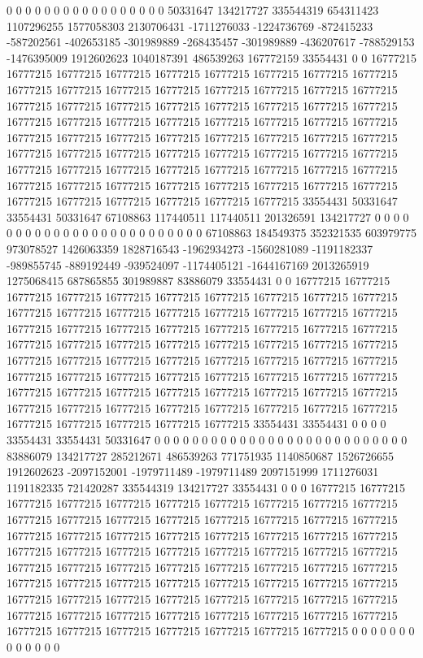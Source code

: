 0 0 0 0 0 0 0 0 0 0 0 0 0 0 0 0 0 50331647 134217727 335544319 654311423 1107296255 1577058303 2130706431 -1711276033 -1224736769 -872415233 -587202561 -402653185 -301989889 -268435457 -301989889 -436207617 -788529153 -1476395009 1912602623 1040187391 486539263 167772159 33554431 0 0 16777215 16777215 16777215 16777215 16777215 16777215 16777215 16777215 16777215 16777215 16777215 16777215 16777215 16777215 16777215 16777215 16777215 16777215 16777215 16777215 16777215 16777215 16777215 16777215 16777215 16777215 16777215 16777215 16777215 16777215 16777215 16777215 16777215 16777215 16777215 16777215 16777215 16777215 16777215 16777215 16777215 16777215 16777215 16777215 16777215 16777215 16777215 16777215 16777215 16777215 16777215 16777215 16777215 16777215 16777215 16777215 16777215 16777215 16777215 16777215 16777215 16777215 16777215 16777215 16777215 16777215 16777215 16777215 16777215 16777215 16777215 33554431 50331647 33554431 50331647 67108863 117440511 117440511 201326591 134217727 0 0 0 0 0 0
0 0 0 0 0 0 0 0 0 0 0 0 0 0 0 0 0 0 0 67108863 184549375 352321535 603979775 973078527 1426063359 1828716543 -1962934273 -1560281089 -1191182337 -989855745 -889192449 -939524097 -1174405121 -1644167169 2013265919 1275068415 687865855 301989887 83886079 33554431 0 0 16777215 16777215 16777215 16777215 16777215 16777215 16777215 16777215 16777215 16777215 16777215 16777215 16777215 16777215 16777215 16777215 16777215 16777215 16777215 16777215 16777215 16777215 16777215 16777215 16777215 16777215 16777215 16777215 16777215 16777215 16777215 16777215 16777215 16777215 16777215 16777215 16777215 16777215 16777215 16777215 16777215 16777215 16777215 16777215 16777215 16777215 16777215 16777215 16777215 16777215 16777215 16777215 16777215 16777215 16777215 16777215 16777215 16777215 16777215 16777215 16777215 16777215 16777215 16777215 16777215 16777215 16777215 16777215 16777215 16777215 16777215 33554431 33554431 0 0 0 0 33554431 33554431 50331647 0 0 0 0 0 0
0 0 0 0 0 0 0 0 0 0 0 0 0 0 0 0 0 0 0 0 0 83886079 134217727 285212671 486539263 771751935 1140850687 1526726655 1912602623 -2097152001 -1979711489 -1979711489 2097151999 1711276031 1191182335 721420287 335544319 134217727 33554431 0 0 0 16777215 16777215 16777215 16777215 16777215 16777215 16777215 16777215 16777215 16777215 16777215 16777215 16777215 16777215 16777215 16777215 16777215 16777215 16777215 16777215 16777215 16777215 16777215 16777215 16777215 16777215 16777215 16777215 16777215 16777215 16777215 16777215 16777215 16777215 16777215 16777215 16777215 16777215 16777215 16777215 16777215 16777215 16777215 16777215 16777215 16777215 16777215 16777215 16777215 16777215 16777215 16777215 16777215 16777215 16777215 16777215 16777215 16777215 16777215 16777215 16777215 16777215 16777215 16777215 16777215 16777215 16777215 16777215 16777215 16777215 16777215 16777215 16777215 0 0 0 0 0 0 0 0 0 0 0 0 0
